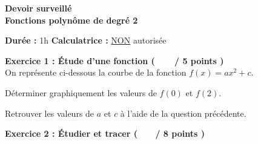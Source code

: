 \documentclass[12pt,a4paper]{exam}
\begin{document}
\begin{center}
    \Large\textbf{Devoir surveillé\\Fonctions polynôme de degré 2}
\end{center}

\vspace{0.3cm}

\noindent
\textbf{Durée :} 1h \hfill
\textbf{Calculatrice :} \underline{NON} autorisée

\vspace{0.5cm}

\noindent
\textbf{Exercice 1 : Étude d’une fonction (\ \ \ \  / 5 points )}
\vspace{5pt}
\noindent\\On représente ci-dessous la courbe de la fonction $f(x) = ax^2+c$.

\begin{center}
\end{center}


\begin{questions}

\question[2] Déterminer graphiquement les valeurs de $f(0)$ et $f(2)$.

\question[3] Retrouver les valeurs de $a$ et $c$ à l'aide de la question
précédente.

\end{questions}

\vspace{0.5cm}

\noindent
\textbf{Exercice 2 : Étudier et tracer ( \ \ \ / 8 points )}
\end{document}
